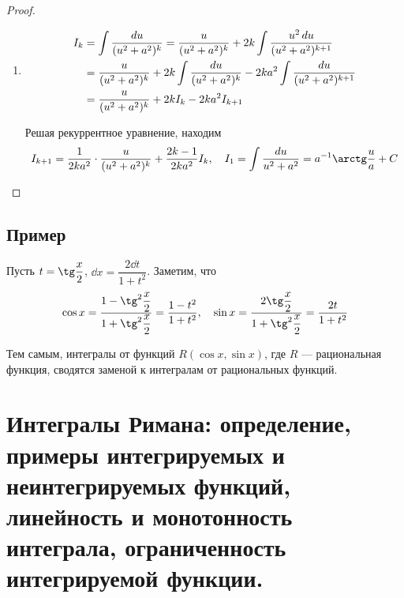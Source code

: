 \documentclass[a4paper]{article}
\theoremstyle{named}
\renewcommand{\int}{\intop}
\begin{document}
\begin{proof}
\begin{enumerate}
            \item
                \begin{align*}
                    I_k 
                    &= \int \dfrac{\dd u}{(u^2 + a^2)^k}
                    = \dfrac{u}{(u^2 + a^2)^k} + 2k \int \dfrac{u^2 \dd u}{(u^2 + a^2)^{k + 1}} \\
                    &= \dfrac{u}{(u^2 + a^2)^k} + 2k \int \dfrac{\dd u}{(u^2 + a^2)^k} - 2ka^2 \int \dfrac{\dd u}{(u^2 + a^2)^{k + 1}} \\
                    &= \dfrac{u}{(u^2 + a^2)^k} + 2kI_k - 2ka^2I_{k + 1}
                \end{align*}

                Решая рекуррентное уравнение, находим
                \begin{equation*}
                    I_{k + 1} = \dfrac{1}{2ka^2} \cdot \dfrac{u}{(u^2 + a^2)^k} + \dfrac{2k - 1}{2ka^2}I_k, \quad
                    I_1 = \int \dfrac{\dd u}{u^2 + a^2} = a^{-1} \arctg \dfrac{u}{a} + C
                \end{equation*}
            \end{enumerate}
        \end{proof}

        \subsection{Пример}

        \begin{example*}
            Пусть $t = \tg \dfrac{x}{2}$, $\dd x = \dfrac{2 \dd t}{1 + t^2}$. Заметим, что
            \begin{equation*}
                \cos x = \dfrac{1 - \tg^2 \dfrac{x}{2}}{1 + \tg^2 \dfrac{x}{2}} = \dfrac{1 - t^2}{1 + t^2}, \quad
                \sin x = \dfrac{2 \tg \dfrac{x}{2}}{1 + \tg^2 \dfrac{x}{2}} = \dfrac{2t}{1 + t^2}
            \end{equation*}

            Тем самым, интегралы от функций $R(\cos x, \sin x)$, где $R$ --- рациональная функция, сводятся заменой к интегралам от рациональных функций.
        \end{example*}

    \section{Интегралы Римана: определение, примеры интегрируемых и неинтегрируемых функций, линейность и монотонность интеграла, ограниченность интегрируемой функции.}
\end{document}
